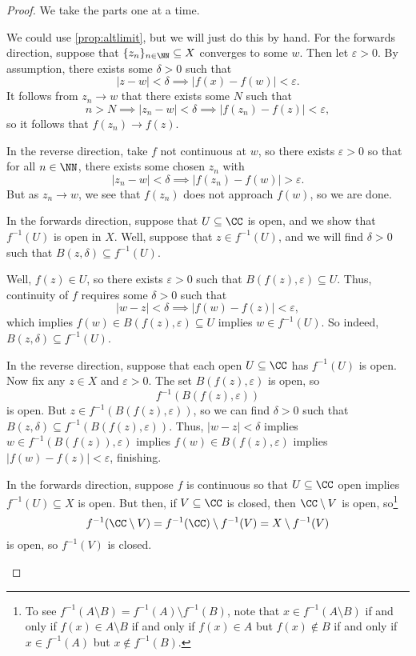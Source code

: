 \begin{proof}
	We take the parts one at a time.
	\begin{listalph}
		\item We could use \autoref{prop:altlimit}, but we will just do this by hand. For the forwards direction, suppose that $\{z_n\}_{n\in\NN}\subseteq X$ converges to some $w$. Then let $\varepsilon>0$. By assumption, there exists some $\delta>0$ such that
		\[|z-w|<\delta\implies|f(x)-f(w)|<\varepsilon.\]
		It follows from $z_n\to w$ that there exists some $N$ such that
		\[n>N\implies|z_n-w|<\delta\implies|f(z_n)-f(z)|<\varepsilon,\]
		so it follows that $f(z_n)\to f(z)$.
		
		In the reverse direction, take $f$ not continuous at $w$, so there exists $\varepsilon>0$ so that for all $n\in\NN$, there exists some chosen $z_n$ with
		\[|z_n-w|<\delta\implies|f(z_n)-f(w)|>\varepsilon.\]
		But as $z_n\to w$, we see that $f(z_n)$ does not approach $f(w)$, so we are done.

		\item In the forwards direction, suppose that $U\subseteq\CC$ is open, and we show that $f^{-1}(U)$ is open in $X$. Well, suppose that $z\in f^{-1}(U)$, and we will find $\delta>0$ such that $B(z,\delta)\subseteq f^{-1}(U)$. 
		
		Well, $f(z)\in U$, so there exists $\varepsilon>0$ such that $B(f(z),\varepsilon)\subseteq U$. Thus, continuity of $f$ requires some $\delta>0$ such that
		\[|w-z|<\delta\implies|f(w)-f(z)|<\varepsilon,\]
		which implies $f(w)\in B(f(z),\varepsilon)\subseteq U$ implies $w\in f^{-1}(U)$. So indeed, $B(z,\delta)\subseteq f^{-1}(U)$.

		In the reverse direction, suppose that each open $U\subseteq\CC$ has $f^{-1}(U)$ is open. Now fix any $z\in X$ and $\varepsilon>0$. The set $B(f(z),\varepsilon)$ is open, so
		\[f^{-1}(B(f(z),\varepsilon))\]
		is open. But $z\in f^{-1}(B(f(z),\varepsilon))$, so we can find $\delta>0$ such that $B(z,\delta)\subseteq f^{-1}(B(f(z),\varepsilon))$. Thus, $|w-z|<\delta$ implies $w\in f^{-1}(B(f(z)),\varepsilon)$ implies $f(w)\in B(f(z),\varepsilon)$ implies $|f(w)-f(z)|<\varepsilon$, finishing.

		\item In the forwards direction, suppose $f$ is continuous so that $U\subseteq\CC$ open implies $f^{-1}(U)\subseteq X$ is open. But then, if $V\subseteq\CC$ is closed, then $\CC\setminus V$ is open, so\footnote{To see $f^{-1}(A\setminus B)=f^{-1}(A)\setminus f^{-1}(B)$, note that $x\in f^{-1}(A\setminus B)$ if and only if $f(x)\in A\setminus B$ if and only if $f(x)\in A$ but $f(x)\notin B$ if and only if $x\in f^{-1}(A)$ but $x\notin f^{-1}(B)$.}
		\[f^{-1}(\CC\setminus V)=f^{-1}(\CC)\setminus f^{-1}(V)=X\setminus f^{-1}(V)\]
		is open, so $f^{-1}(V)$ is closed.


\end{listalph}
\end{proof}
